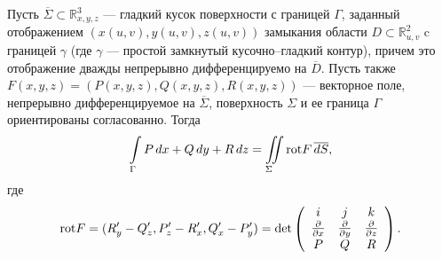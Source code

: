 \begin{Theorem}
Пусть $\overline{\Sigma}\subset {\mathbb R}^3_{x,y,z}$ --- гладкий кусок поверхности с границей
$\Gamma$, заданный отображением $(x(u,v),y(u,v),z(u,v))$ замыкания
области $D\subset{\mathbb R}^2_{u,v}$ c границей $\gamma$ (где $\gamma$ --- простой замкнутый
кусочно--гладкий контур), причем это отображение
дважды непрерывно дифференцируемо на $\overline{D}$. Пусть также
$F(x,y,z)=(P(x,y,z), Q(x,y,z),R(x,y,z))$ --- векторное поле, непрерывно дифференцируемое
на $\overline{\Sigma}$, поверхность $\Sigma$ и ее граница $\Gamma$ ориентированы согласованно.
Тогда
$$
\int\limits_{\Gamma} P\,dx + Q\,dy + R\,dz = \int\limits_{\Sigma}\!\!\!\!\int {\rm rot} F\, \overline{dS},
$$
где
$$
{\rm rot} F = (R'_y - Q'_z, P'_z - R'_x, Q'_x - P'_y) = {\rm det}
\left(
\begin{array}{ccc}
i & j & k \\
\frac{\partial}{\partial x} & \frac{\partial}{\partial y} & \frac{\partial}{\partial z} \\
P & Q & R \\
\end{array}
\right).
$$
\end{Theorem}
